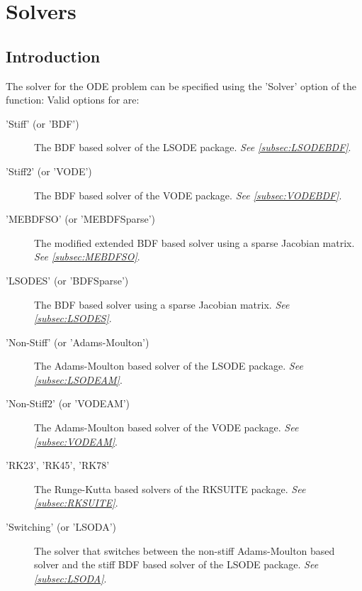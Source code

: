 \chapter{Solvers}
\section{Introduction}
The solver for the ODE problem can be specified using the 'Solver' option of the  function:
Valid options for  are:
\begin{description}
 \item['Stiff' (or 'BDF')] The BDF based solver of the LSODE package. \emph{See \ref{subsec:LSODEBDF}}.
 \item['Stiff2' (or 'VODE')] The BDF based solver of the VODE package. \emph{See \ref{subsec:VODEBDF}}.
 \item['MEBDFSO' (or 'MEBDFSparse')] The modified extended BDF based solver using a sparse Jacobian matrix. \emph{See \ref{subsec:MEBDFSO}}.
 \item['LSODES' (or 'BDFSparse')] The BDF based solver using a sparse Jacobian matrix. \emph{See \ref{subsec:LSODES}}.
 \item['Non-Stiff' (or 'Adams-Moulton')] The Adams-Moulton based solver of the LSODE package. \emph{See \ref{subsec:LSODEAM}}.
 \item['Non-Stiff2' (or 'VODEAM')] The Adams-Moulton based solver of the VODE package. \emph{See \ref{subsec:VODEAM}}.
 \item['RK23', 'RK45', 'RK78'] The Runge-Kutta based solvers of the RKSUITE package. \emph{See \ref{subsec:RKSUITE}}.
 \item['Switching' (or 'LSODA')] The solver that switches between the non-stiff Adams-Moulton based solver and the stiff BDF based solver of the LSODE package. \emph{See \ref{subsec:LSODA}}.
\end{description}

